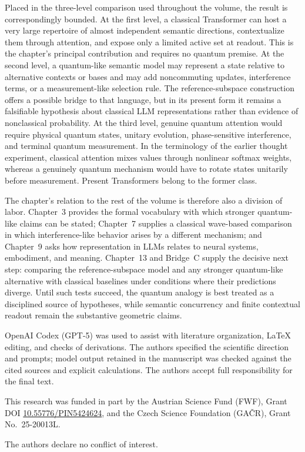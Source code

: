 \documentclass[
  aps,
  reprint,
  superscriptaddress,
  floatfix,
  nofootinbib,
  longbibliography
]{revtex4-2}
\begin{document}
Placed in the three-level comparison used throughout the volume, the result
is correspondingly bounded.  At the first level, a classical Transformer
can host a very large repertoire of almost independent semantic directions,
contextualize them through attention, and expose only a limited active set at
readout.  This is the chapter's principal contribution and requires no
quantum premise.  At the second level, a quantum-like semantic model may
represent a state relative to alternative contexts or bases and may add
noncommuting updates, interference terms, or a measurement-like selection
rule. The reference-subspace construction offers a possible bridge to that
language, but in its present form it remains a falsifiable hypothesis about
classical LLM representations rather than evidence of nonclassical
probability.  At the third level, genuine quantum attention would require
physical quantum states, unitary evolution, phase-sensitive interference,
and terminal quantum measurement.  In the terminology of the earlier
thought experiment, classical attention mixes values through nonlinear
softmax weights, whereas a genuinely quantum mechanism would have to rotate
states unitarily before measurement.  Present Transformers belong to the
former class.

The chapter's relation to the rest of the volume is therefore also a division
of labor.  Chapter~3 provides the formal vocabulary with which stronger
quantum-like claims can be stated; Chapter~7 supplies a classical
wave-based comparison in which interference-like behavior arises by a
different mechanism; and Chapter~9 asks how representation in LLMs relates
to neural systems, embodiment, and meaning.  Chapter~13 and Bridge~C supply
the decisive next step: comparing the reference-subspace model and any stronger
quantum-like alternative with classical baselines under conditions where
their predictions diverge.  Until such tests succeed, the quantum analogy is
best treated as a disciplined source of hypotheses, while semantic
concurrency and finite contextual readout remain the substantive geometric
claims.

\begin{acknowledgments}
OpenAI Codex (GPT-5) was used to assist with literature organization, \LaTeX{}
editing, and checks of derivations.  The authors specified the scientific
direction and prompts; model output retained in the manuscript was checked
against the cited sources and explicit calculations.  The authors accept full
responsibility for the final text.

This research was funded in part by the Austrian
Science Fund (FWF), Grant DOI \href{https://doi.org/10.55776/PIN5424624}{10.55776/PIN5424624}, and the Czech Science
Foundation (GA\v{C}R), Grant No.~25-20013L.

The authors declare no conflict of interest.
\end{acknowledgments}


\end{document}

